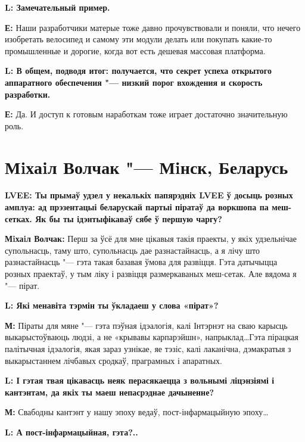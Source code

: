 \documentclass[10pt, a5paper]{article}
\begin{document}
{\noindent \bf L: Замечательный пример.}

{\noindent \bf Е:} Наши разработчики матерые тоже давно прочувствовали и поняли, что нечего изобретать велосипед и самому эти модули делать или покупать какие-то промышленные  и дорогие, когда вот есть дешевая массовая платформа.


{\noindent \bf L: В общем, подводя итог: получается, что секрет успеха открытого аппаратного обеспечения "--- низкий порог вхождения и скорость разработки.}

{\noindent \bf Е:} Да. И доступ к готовым наработкам тоже играет достаточно значительную роль.


\section{Мiхаiл Волчак "---  Мiнск, Беларусь}

{\noindent \bf LVEE: Ты прымаў удзел у некалькіх папярэдніх LVEE ў досыць розных амплуа: ад прэзентацыі беларускай партыі піратаў да воркшопа па меш-сетках. Як бы ты ідэнтыфікаваў сябе ў першую чаргу?
}

{\noindent \bf Мiхаiл Волчак:} Перш за ўсё для мне цікавыя такія праекты, у якіх удзельнічае супольнасць, таму што, супольнасць дае разнастайнасць, а я лічу што разнастайнасць "--- гэта такая базавая ўмова для развіцця. Гэта датычыцца розных праектаў, у тым ліку і развіцця размеркаваных меш-сетак. Але вядома я "--- пірат.

{\noindent \bf L: Які менавіта тэрмін ты ўкладаеш у слова «пірат»?}

{\noindent \bf М:} Піраты для мяне "--- гэта пэўная ідэалогія, калі Інтэрнэт на сваю карысць выкарыстоўваюць людзі, а не «крывавы карпарэйшн», напрыклад\ldots Гэта пірацкая палітычная ідэалогія, якая зараз узнікае, яе тэзіс, калі лаканічна, дэмакратыя з выкарыстаннем лічбавых сродкаў, праграмных і апаратных.




{\noindent \bf L: І гэтая твая цікавасць неяк перасякаецца з вольнымі ліцэнзіямі і кантэнтам, да якіх ты маеш непасрэднае дачыненне?} 

{\noindent \bf М:}  Свабодны кантэнт у нашу эпоху ведаў, пост-інфармацыйную эпоху\ldots

{\noindent \bf L: А пост-інфармацыйная, гэта?..}
\end{document}
